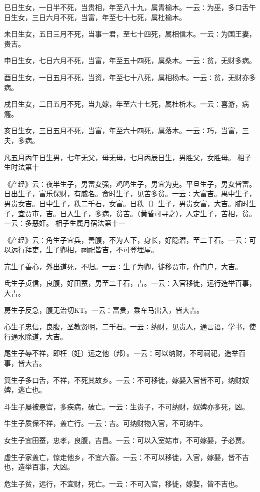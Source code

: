 \documentclass[a4paper,12pt,UTF8,twoside]{ctexbook}
\begin{document}
巳日生女，一日半不死，当贵相，年至八十九，属青榆木。一云∶为巫，多口舌午日生女，三日六月不死，当富，年至七十七死，属杜榆木。

未日生女，五日三月不死，当事一君，至七十四死，属相信木。一云∶为国王妻，贵吉。

申日生女，七日六月不死，当富，年至五十四死，属桑木。一云∶贫，无财多病。

酉日生女，一日五月不死，当资，年至七十八死，属相杨木。一云∶贫，无财亦多病。

戌日生女，二日五月不死，当九嫁，年至六十七死，属杜析木。一云∶喜游，病癃。

亥日生女，三日五月不死，当富，年至六十四死，属落木。一云∶巧，当富，三夫，多病。

凡五月丙午日生男，七年无父，母无母，七月丙辰日生，男胜父，女胜母。
相子生时法第十

《产经》云∶夜半生子，男富女强，鸡鸣生子，男宜为吏。平旦生子，男女皆富。日出生子，富乐保财，有威名。食时生子，见苦多贫。一云∶大富吉。禺中生子，男贵女吉。日中生子，秩二千石，女富。日秩（）生子，男贵女富，大吉。脯时生子，宜贾市，吉。日入生子，多病，贫苦。（黄昏可寻之），人定生子，苦相，贫。一云∶多恶奸。
相子生属月宿法第十一

《产经》云∶角生子宜兵，善腹，不为人下，身长，好隐潜，至二千石。一云∶可以远行拜吏，生子卿相，祠祀皆吉，不可登埋屋。

亢生子善心，外出道死，不归。一云∶生子为卿，徙移贾市，作门户，大吉。

氐生子贞信，良腹，好田蚕，男至二千石，吉。一云∶入官移徙，远行造举百事，大吉。

房生子反急，腹无治切KT。一云∶富贵，乘车马出入，皆大吉。

心生子忠信，良腹，圣教贤明，二千石。一云∶纳财，见贵人，通言语，学书，使行通水除道，大吉。

尾生子辱不祥，即枉（妊）远之他（邦）。一云∶可以纳财，不可祠祀，造举百事，皆大吉。

箕生子多口舌，不祥，不死其故乡。一云∶不可移徙，嫁娶入官皆不可，纳财奴婢，逃亡也。

斗生子屡被悬官，多疾病，破亡。一云∶生贵子，不可纳财，奴婢亦多死，凶。

牛生子质保不祥，盖亡行。一云∶吉。可纳财物入官，不可纳牛。

女生子宜田蚕，忠孝，良腹，吉昌。一云∶可以入室姑市，不可嫁娶，子必贾。

虚生子家盖亡，惊走他乡，不宜六畜。一云∶不可以移徙，入官，嫁娶，皆不吉也，造举百事，大凶。

危生子贫，远行，不宜财，死亡。一云∶不可入官，移徙，嫁娶，皆不吉也。
\end{document}
